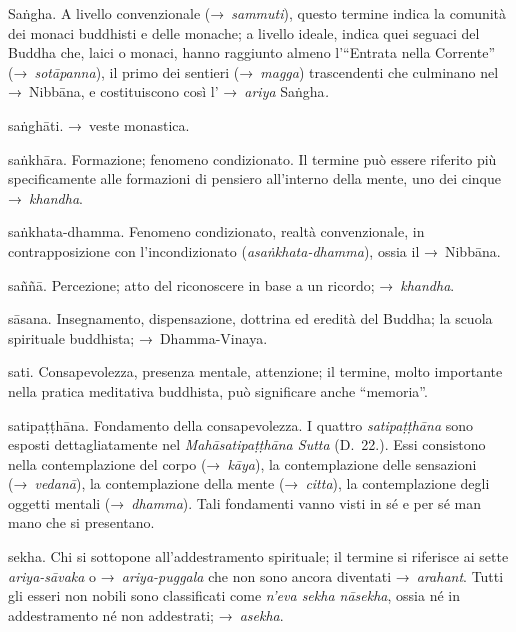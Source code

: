 \begin{glossarydescription}
\item[Saṅgha.] A livello convenzionale (→~\emph{sammuti}), questo termine
  indica la comunità dei monaci buddhisti e delle monache; a livello ideale,
  indica quei seguaci del Buddha che, laici o monaci, hanno raggiunto almeno
  l'``Entrata nella Corrente'' (→~\emph{sotāpanna}), il primo dei sentieri
  (→~\emph{magga}) trascendenti che culminano nel →~Nibbāna, e
  costituiscono così l' →~\emph{ariya} Saṅgha\emph{.}

\item[saṅghāti.] →~veste monastica.

\item[saṅkhāra.] Formazione; fenomeno condizionato. Il termine può essere
  riferito più specificamente alle formazioni di pensiero all'interno della
  mente, uno dei cinque →~\emph{khandha}.

\item[saṅkhata-dhamma.] Fenomeno condizionato, realtà convenzionale, in
  contrapposizione con l'incondizionato (\emph{asaṅkhata-dhamma}), ossia il
  →~Nibbāna.

\item[saññā.] Percezione; atto del riconoscere in base a un ricordo;
  →~\emph{khandha}.

\item[sāsana.] Insegnamento, dispensazione, dottrina ed eredità del
  Buddha; la scuola spirituale buddhista; →~Dhamma-Vinaya.

\item[sati.] Consapevolezza, presenza mentale, attenzione; il termine,
  molto importante nella pratica meditativa buddhista, può significare anche
  ``memoria''.

\item[satipaṭṭhāna.]\label{glossary-satipatthana} Fondamento della consapevolezza. I quattro
  \emph{satipaṭṭhāna} sono esposti dettagliatamente nel
  \emph{Mahāsatipaṭṭhāna Sutta} (D.~22.). Essi consistono
  nella contemplazione del corpo (→~\emph{kāya}), la contemplazione delle
  sensazioni (→~\emph{vedanā}), la contemplazione della mente (→~\emph{citta}),
  la contemplazione degli oggetti mentali (→~\emph{dhamma}). Tali fondamenti
  vanno visti in sé e per sé man mano che si presentano.

\item[sekha.] Chi si sottopone all'addestramento spirituale; il termine si
  riferisce ai sette \emph{ariya-sāvaka} o →~\emph{ariya-puggala} che non sono
  ancora diventati →~\emph{arahant}. Tutti gli esseri non nobili sono
  classificati come \emph{n'eva sekha nāsekha}, ossia né in addestramento né non
  addestrati; →~\emph{asekha}.


\end{glossarydescription}
